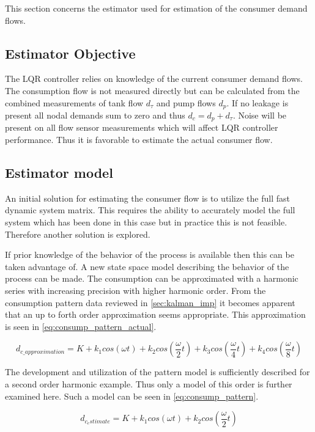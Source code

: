 This section concerns the estimator used for estimation of the consumer demand flows.

\subsection{Estimator Objective}
The LQR controller relies on knowledge of the current  consumer demand flows. The consumption flow is not measured directly but can be calculated from the combined measurements of tank flow $d_\tau$ and pump flows $d_p$. If no leakage is present all nodal demands sum to zero and thus $d_c = d_p + d_\tau$.  Noise will be present on all flow sensor measurements which will affect LQR controller performance. Thus it is favorable to estimate the actual consumer flow.

\subsection{Estimator model}
An initial solution for estimating the consumer flow is to utilize the full fast dynamic system matrix. This requires the ability to accurately model the full system which has been done in this case but in practice this is not feasible. Therefore another solution is explored.

If prior knowledge of the behavior of the process is available then this can be taken advantage of. A new state space model describing the behavior of the process can be made. The consumption can be approximated with a harmonic series with increasing precision with higher harmonic order. From the consumption pattern data reviewed in \cref{sec:kalman_imp} it becomes apparent that an up to forth order approximation seems appropriate. This approximation is seen in \cref{eq:consump_pattern_actual}.

\begin{equation} \label{eq:consump_pattern_actual}
	d_{c\_approximation} = K + k_1 cos(\omega t) + k_2 cos(\frac{\omega}{2} t) + k_3 cos(\frac{\omega}{4} t) + k_4 cos(\frac{\omega}{8} t)
\end{equation}

The development and utilization of the pattern model is sufficiently described for a second order harmonic example. Thus only a model of this order is further examined here. Such a model can be seen in \cref{eq:consump_pattern}. 

\begin{equation} \label{eq:consump_pattern}
	d_{c_estimate} = K + k_1 cos(\omega t) + k_2 cos(\frac{\omega}{2} t)
\end{equation}



